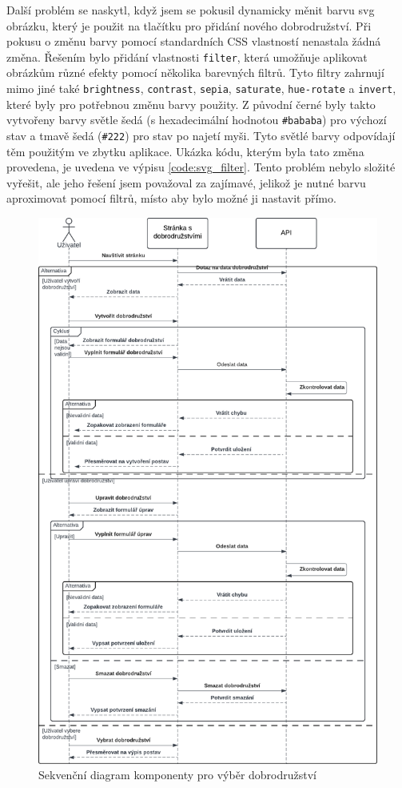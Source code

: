 Další problém se naskytl, když jsem se pokusil dynamicky měnit barvu svg obrázku, který je použit na tlačítku pro přidání nového dobrodružství. Při pokusu o změnu barvy pomocí standardních CSS vlastností nenastala žádná změna. Řešením bylo přidání vlastnosti \texttt{filter}, která umožňuje aplikovat obrázkům různé efekty pomocí několika barevných filtrů. Tyto filtry zahrnují mimo jiné také \texttt{brightness}, \texttt{contrast}, \texttt{sepia}, \texttt{saturate}, \texttt{hue-rotate} a \texttt{invert}, které byly pro potřebnou změnu barvy použity. Z původní černé byly takto vytvořeny barvy světle šedá (s hexadecimální hodnotou \texttt{\#bababa}) pro výchozí stav a tmavě šedá (\texttt{\#222}) pro stav po najetí myši. Tyto světlé barvy odpovídají těm použitým ve zbytku aplikace. Ukázka kódu, kterým byla tato změna provedena, je uvedena ve výpisu \ref{code:svg_filter}. Tento problém nebylo složité vyřešit, ale jeho řešení jsem považoval za zajímavé, jelikož je nutné barvu aproximovat pomocí filtrů, místo aby bylo možné ji nastavit přímo.

\begin{figure}[htbp]
  \centering
  \includegraphics[width=.80\textwidth]{resources/figures/adventure_diagram.pdf}
  \caption{Sekvenční diagram komponenty pro výběr dobrodružství}
  \label{fig:adventure_diagram}
\end{figure}

